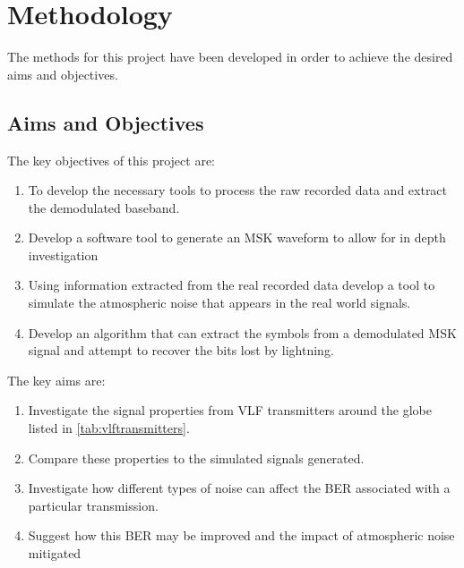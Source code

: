 \chapter{Methodology}
The methods for this project have been developed in order to achieve the desired aims and objectives.

\section{Aims and Objectives}

The key objectives of this project are:

\begin{enumerate}
    \item To develop the necessary tools to process the raw recorded data and extract the demodulated baseband.
    \item Develop a software tool to generate an MSK waveform to allow for in depth investigation
    \item Using information extracted from the real recorded data develop a tool to simulate the atmospheric noise that appears in the real world signals.
    \item Develop an algorithm that can extract the symbols from a demodulated MSK signal and attempt to recover the bits lost by lightning.
\end{enumerate}

The key aims are:

\begin{enumerate}
    \item Investigate the signal properties from VLF transmitters around the globe listed in \ref{tab:vlftransmitters}. 
    \item Compare these properties to the simulated signals generated.
    \item Investigate how different types of noise can affect the BER associated with a particular transmission.
    \item Suggest how this BER may be improved and the impact of atmospheric noise mitigated
\end{enumerate}
